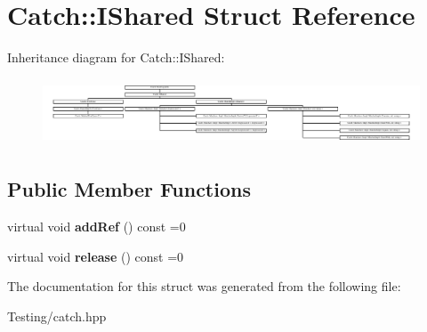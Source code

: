 \hypertarget{struct_catch_1_1_i_shared}{\section{Catch\-:\-:I\-Shared Struct Reference}
\label{struct_catch_1_1_i_shared}
}
Inheritance diagram for Catch\-:\-:I\-Shared\-:\begin{figure}[H]
\begin{center}
\leavevmode
\includegraphics[height=2.004474cm]{struct_catch_1_1_i_shared}
\end{center}
\end{figure}
\subsection*{Public Member Functions}
\begin{DoxyCompactItemize}
\item 
\hypertarget{struct_catch_1_1_i_shared_ae383df68557cdaf0910b411af04d9e33}{virtual void {\bfseries add\-Ref} () const =0}\label{struct_catch_1_1_i_shared_ae383df68557cdaf0910b411af04d9e33}

\item 
\hypertarget{struct_catch_1_1_i_shared_a002f52624728a763956fb6f230cb2f57}{virtual void {\bfseries release} () const =0}\label{struct_catch_1_1_i_shared_a002f52624728a763956fb6f230cb2f57}

\end{DoxyCompactItemize}


The documentation for this struct was generated from the following file\-:\begin{DoxyCompactItemize}
\item 
Testing/catch.\-hpp\end{DoxyCompactItemize}
